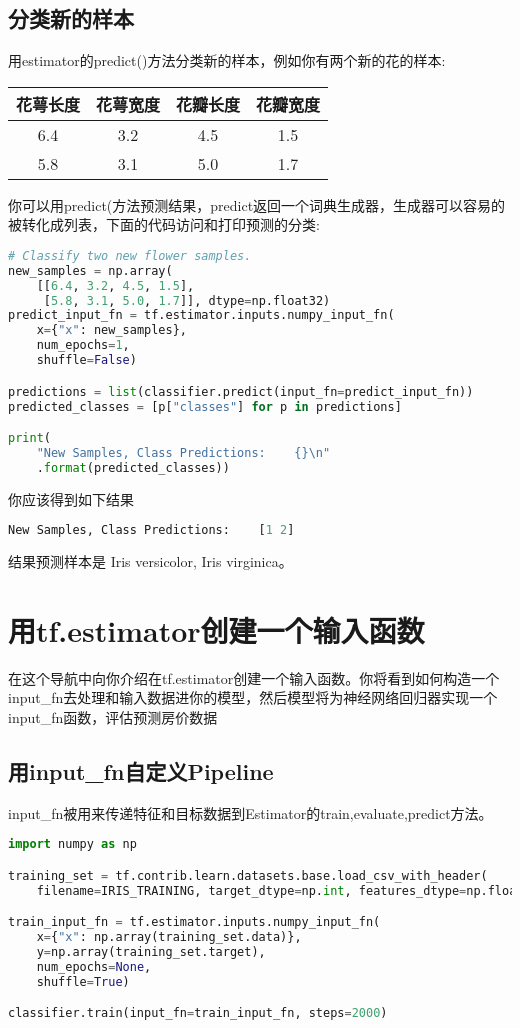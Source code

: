 \subsection{分类新的样本}
用estimator的predict()方法分类新的样本，例如你有两个新的花的样本:\par
\begin{table}
\centering
\begin{tabular}{|c|c|c|c|}
\hline
花萼长度&花萼宽度&花瓣长度&花瓣宽度\\
\hline
6.4&3.2&4.5&1.5\\
\hline
5.8&3.1&5.0&1.7\\
\hline
\end{tabular}
\end{table}
\par
你可以用predict(方法预测结果，predict返回一个词典生成器，生成器可以容易的被转化成列表，下面的代码访问和打印预测的分类:
\begin{lstlisting}[language=Python]
# Classify two new flower samples.
new_samples = np.array(
    [[6.4, 3.2, 4.5, 1.5],
     [5.8, 3.1, 5.0, 1.7]], dtype=np.float32)
predict_input_fn = tf.estimator.inputs.numpy_input_fn(
    x={"x": new_samples},
    num_epochs=1,
    shuffle=False)

predictions = list(classifier.predict(input_fn=predict_input_fn))
predicted_classes = [p["classes"] for p in predictions]

print(
    "New Samples, Class Predictions:    {}\n"
    .format(predicted_classes))
\end{lstlisting}
你应该得到如下结果
\begin{lstlisting}[language=Python]
New Samples, Class Predictions:    [1 2]
\end{lstlisting}
结果预测样本是 Iris versicolor, Iris virginica。
\section{用tf.estimator创建一个输入函数}
在这个导航中向你介绍在tf.estimator创建一个输入函数。你将看到如何构造一个input\_fn去处理和输入数据进你的模型，然后模型将为神经网络回归器实现一个input\_fn函数，评估预测房价数据
\subsection{用input\_fn自定义Pipeline}
input\_fn被用来传递特征和目标数据到Estimator的train,evaluate,predict方法。
\begin{lstlisting}[language=Python]
import numpy as np

training_set = tf.contrib.learn.datasets.base.load_csv_with_header(
    filename=IRIS_TRAINING, target_dtype=np.int, features_dtype=np.float32)

train_input_fn = tf.estimator.inputs.numpy_input_fn(
    x={"x": np.array(training_set.data)},
    y=np.array(training_set.target),
    num_epochs=None,
    shuffle=True)

classifier.train(input_fn=train_input_fn, steps=2000)
\end{lstlisting}
